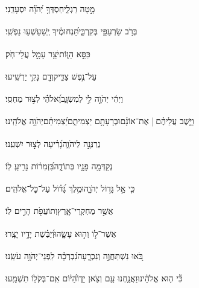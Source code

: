 \documentclass[12pt]{article}
\newcommand{\loc}[1]{\textsuperscript{\locf{#1}}}
\begin{document}
{\loc{ יח}~}‏ מָ֣טָה רַגְלִ֑י{\hfill}חַסְדְּךָ֥ יְ֝הֹוָ֗ה יִסְעָדֵֽנִי׃\par

{\loc{ יט}~}‏בְּרֹ֣ב שַׂרְעַפַּ֣י בְּקִרְבִּ֑י{\hfill}תַּ֝נְחוּמֶ֗יךָ יְֽשַׁעַשְׁע֥וּ נַפְשִֽׁי׃\par

{\loc{ כ}~}‏ כִּסֵּ֣א הַוּ֑וֹת{\hfill}יֹצֵ֖ר עָמָ֣ל עֲלֵי־חֹֽק׃\par

{\loc{ כא}~}‏ עַל־נֶ֣פֶשׁ צַדִּ֑יק{\hfill}וְדָ֖ם נָקִ֣י יַרְשִֽׁיעוּ׃\par

{\loc{ כב}~}‏וַיְהִ֬י יְהֹוָ֣ה לִ֣י לְמִשְׂגָּ֑ב{\hfill}וֵ֝אלֹהַ֗י לְצ֣וּר מַחְסִֽי׃\par

{\loc{ כג}~}‏וַיָּ֤שֶׁב עֲלֵיהֶ֨ם |  אֶת־אוֹנָ֗ם{\hfill}וּבְרָעָתָ֥ם יַצְמִיתֵ֑ם\newline\hspace*{.5em}יַ֝צְמִיתֵ֗ם{\hfill}יְהֹוָ֥ה אֱלֹהֵֽינוּ׃\par\pend
\ledpb
\pstart[\subsection*{\textcolor{red}{פרק צה}}]\label{פרק צה}
{\loc{ א}~}‏ נְרַנְּנָ֣ה לַיהֹוָ֑ה{\hfill}נָ֝רִ֗יעָה לְצ֣וּר יִשְׁעֵֽנוּ׃\par

{\loc{ ב}~}‏נְקַדְּמָ֣ה פָנָ֣יו בְּתוֹדָ֑ה{\hfill}בִּ֝זְמִר֗וֹת נָרִ֥יעַֽ לֽוֹ׃\par

{\loc{ ג}~}‏כִּ֤י אֵ֣ל גָּד֣וֹל יְהֹוָ֑ה{\hfill}וּמֶ֥לֶךְ גָּ֝ד֗וֹל עַל־כׇּל־אֱלֹהִֽים׃\par

{\loc{ ד}~}‏אֲשֶׁ֣ר  מֶחְקְרֵי־אָ֑רֶץ{\hfill}וְתוֹעֲפֹ֖ת הָרִ֣ים לֽוֹ׃\par

{\loc{ ה}~}‏אֲשֶׁר־ל֣וֹ  וְה֣וּא עָשָׂ֑הוּ{\hfill}וְ֝יַבֶּ֗שֶׁת יָדָ֥יו יָצָֽרוּ׃\par

{\loc{ ו}~}‏בֹּ֭אוּ נִשְׁתַּחֲוֶ֣ה וְנִכְרָ֑עָה{\hfill}נִ֝בְרְכָ֗ה לִֽפְנֵי־יְהֹוָ֥ה עֹשֵֽׂנוּ׃\par

{\loc{ ז}~}‏כִּ֘י ה֤וּא אֱלֹהֵ֗ינוּ{\hfill}וַאֲנַ֤חְנוּ עַ֣ם \newline\hspace*{.5em}וְצֹ֣אן יָד֑וֹ{\hfill}הַ֝יּ֗וֹם אִֽם־בְּקֹל֥וֹ תִשְׁמָֽעוּ׃\par
\end{document}
